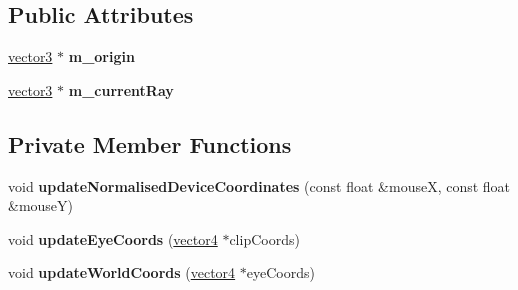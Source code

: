 \subsection*{Public Attributes}
\begin{DoxyCompactItemize}
\item 
\mbox{\label{classflounder_1_1ray_aea6b4658a11f84101113a76a3107851e}} 
\hyperlink{classflounder_1_1vector3}{vector3} $\ast$ {\bfseries m\+\_\+origin}
\item 
\mbox{\label{classflounder_1_1ray_ace55d10e8446f517a24ae9823255e24c}} 
\hyperlink{classflounder_1_1vector3}{vector3} $\ast$ {\bfseries m\+\_\+current\+Ray}
\end{DoxyCompactItemize}
\subsection*{Private Member Functions}
\begin{DoxyCompactItemize}
\item 
\mbox{\label{classflounder_1_1ray_a1a85163a820b3cd2f691dc6587f187d5}} 
void {\bfseries update\+Normalised\+Device\+Coordinates} (const float \&mouseX, const float \&mouseY)
\item 
\mbox{\label{classflounder_1_1ray_a68cfbe54fdc766005edf19690cf5599c}} 
void {\bfseries update\+Eye\+Coords} (\hyperlink{classflounder_1_1vector4}{vector4} $\ast$clip\+Coords)
\item 
\mbox{\label{classflounder_1_1ray_a1005f85f5e2cb3c2eaced3049838f3da}} 
void {\bfseries update\+World\+Coords} (\hyperlink{classflounder_1_1vector4}{vector4} $\ast$eye\+Coords)
\end{DoxyCompactItemize}
